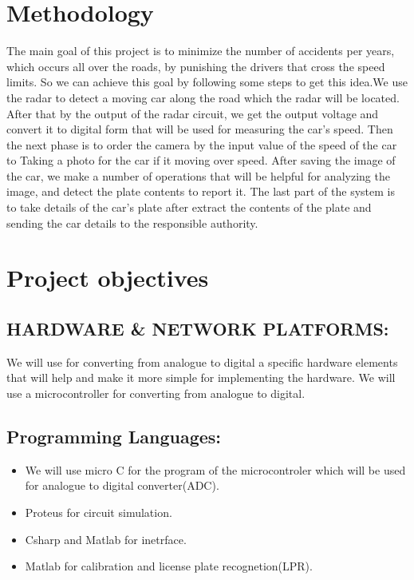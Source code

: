 \section{Methodology}
\noindent The main goal of this project is to minimize the number of
accidents per years, which occurs all over the roads, by
punishing the drivers that cross the speed limits. So we can
achieve this goal by following some steps to get this
idea.We use the radar to detect a moving car along the road
which the radar will be located. After that by the output of
the radar circuit, we get the output voltage and convert it to
digital form that will be used for measuring the car's speed.
Then the next phase is to order the camera by the input
value of the speed of the car to Taking a photo for the car if
it moving over speed. After saving the image of the car, we
make a number of operations that will be helpful for
analyzing the image, and detect the plate contents to report
it. The last part of the system is to take details of the car's
plate after extract the contents of the plate and sending the
car details to the responsible authority.

\section{Project objectives}
\subsection{HARDWARE \& NETWORK PLATFORMS:}
\noindent We will use for converting from analogue to digital a specific
hardware elements that will help and make it more simple for
implementing the hardware. We will use a microcontroller
for converting from analogue to digital.
\subsection{ Programming Languages:} 
\begin{itemize}
	\item We will use micro C for the program of the
	microcontroler which will be used for analogue
	to digital converter(ADC).
	\item Proteus for circuit simulation.
	\item Csharp and Matlab for inetrface.
	\item Matlab for calibration and license plate
	recognetion(LPR).
\end{itemize}
